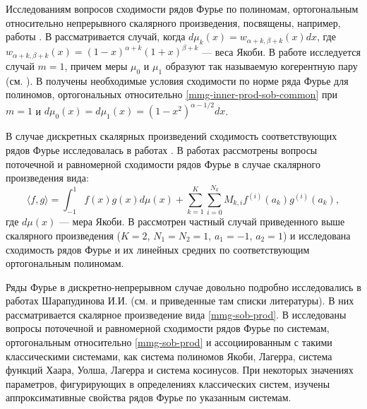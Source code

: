 Исследованиям вопросов сходимости рядов Фурье по полиномам, ортогональным относительно непрерывного скалярного произведения, посвящены, например, работы \cite{mmg-MarcellanJacobiSobolev,mmg-CiaurriJacobiSobolev,mmg-CiaurriCoherentPairs,mmg-Fejzullahu2010,mmg-Fejzullahu2013}. В \cite{mmg-MarcellanJacobiSobolev,mmg-CiaurriJacobiSobolev} рассматривается случай, когда $d\mu_k(x)=w_{\alpha+k,\beta+k}(x)dx$, где $w_{\alpha+k,\beta+k}(x)=(1-x)^{\alpha+k}(1+x)^{\beta+k}$ --- веса Якоби. В работе \cite{mmg-CiaurriCoherentPairs} исследуется случай $m=1$, причем меры $\mu_0$ и $\mu_1$ образуют так называемую когерентную пару (см. \cite{mmg-IserlesKoch1991,mmg-MarcellanXu2015}). В \cite{mmg-Fejzullahu2010} получены необходимые условия сходимости по норме ряда Фурье для полиномов, ортогональных относительно \eqref{mmg-inner-prod-sob-common} при $m=1$ и $d\mu_0(x)=d\mu_1(x)=(1-x^2)^{\alpha-1/2}dx$.

В случае дискретных скалярных произведений сходимость соответствующих рядов Фурье исследовалась в работах \cite{mmg-Marcellan2002,mmg-Rocha2003,mmg-OsilenkerFourier2012,mmg-OsilenkerLinearMethods2015,mmg-Fejzullahu2009,mmg-CiaurriSigma2018}. В работах \cite{mmg-Marcellan2002,mmg-Rocha2003} рассмотрены вопросы поточечной и равномерной сходимости рядов Фурье в случае скалярного произведения вида:
\begin{equation*}
	\langle f,g \rangle = \int_{-1}^{1}f(x)g(x)d\mu(x)+
	\sum_{k=1}^K\sum_{i=0}^{N_k} M_{k,i}f^{(i)}(a_k)g^{(i)}(a_k),
\end{equation*}
где $d\mu(x)$ --- мера Якоби. В \cite{mmg-OsilenkerFourier2012,mmg-OsilenkerLinearMethods2015,mmg-Fejzullahu2009,mmg-CiaurriSigma2018} рассмотрен частный случай приведенного выше скалярного произведения ($K=2$, $N_1=N_2=1$, $a_1=-1$, $a_2=1$) и исследована сходимость рядов Фурье и их линейных средних по соответствующим ортогональным полиномам.

Ряды Фурье в дискретно-непрерывном случае довольно подробно исследовались в работах Шарапудинова И.И. (см. \cite{mmg-SharapudinovUMN,mmg-SharapudinovIzvRan2019} и приведенные там списки литературы). В них рассматривается скалярное произведение вида \eqref{mmg-sob-prod}.
В \cite{mmg-SharapudinovUMN,mmg-SharapudinovIzvRan2019,mmg-MMG2019,mmg-Gadzhimirzaev2019} исследованы вопросы поточечной и равномерной сходимости рядов Фурье по системам, ортогональным относительно \eqref{mmg-sob-prod} и ассоциированным с такими классическими системами, как система полиномов Якоби, Лагерра, система функций Хаара, Уолша, Лагерра и система косинусов. При некоторых значениях параметров, фигурирующих в определениях классических систем, изучены аппроксимативные свойства рядов Фурье по указанным системам.

